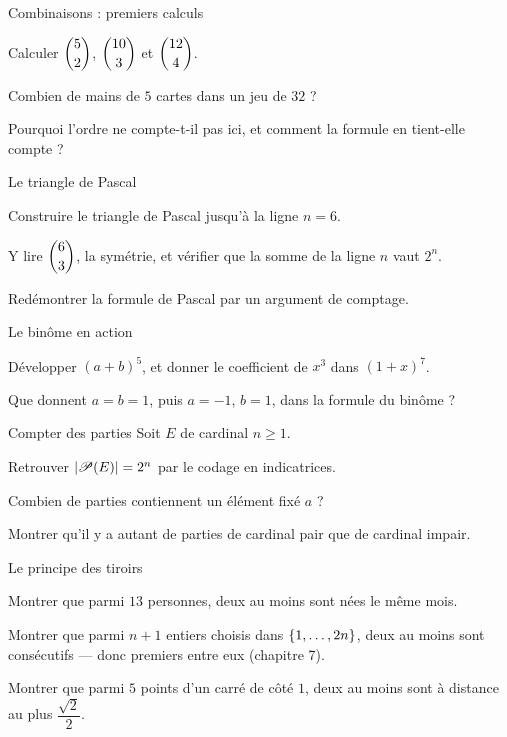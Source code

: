\begin{exercice}[1]{Combinaisons : premiers calculs}
\begin{questions}
  \item Calculer $\dbinom52$, $\dbinom{10}3$ et $\dbinom{12}4$.
  \item Combien de mains de $5$ cartes dans un jeu de $32$ ?
  \item Pourquoi l'ordre ne compte-t-il pas ici, et comment la formule en
    tient-elle compte ?
\end{questions}
\end{exercice}

\begin{exercice}[1]{Le triangle de Pascal}
\begin{questions}
  \item Construire le triangle de Pascal jusqu'à la ligne $n=6$.
  \item Y lire $\dbinom63$, la symétrie, et vérifier que la somme de la
    ligne $n$ vaut $2^{n}$.
  \item Redémontrer la formule de Pascal par un argument de comptage.
\end{questions}
\end{exercice}

\begin{exercice}[1]{Le binôme en action}
\begin{questions}
  \item Développer $(a+b)^{5}$, et donner le coefficient de $x^{3}$ dans
    $(1+x)^{7}$.
  \item Que donnent $a=b=1$, puis $a=-1$, $b=1$, dans la formule du
    binôme ?
\end{questions}
\end{exercice}

\begin{exercice}[1]{Compter des parties}
Soit $E$ de cardinal $n\geqslant1$.
\begin{questions}
  \item Retrouver $|\mathscr{P}(E)|=2^{n}$ par le codage en indicatrices.
  \item Combien de parties contiennent un élément fixé $a$ ?
  \item Montrer qu'il y a autant de parties de cardinal pair que de
    cardinal impair.
\end{questions}
\end{exercice}


\begin{exercice}[2]{Le principe des tiroirs}
\begin{questions}
  \item Montrer que parmi $13$ personnes, deux au moins sont nées le même
    mois.
  \item Montrer que parmi $n+1$ entiers choisis dans $\left\{1,\dots,2n\right\}$,
    deux au moins sont consécutifs — donc premiers entre eux
    (chapitre 7).
  \item Montrer que parmi $5$ points d'un carré de côté $1$, deux au
    moins sont à distance au plus $\dfrac{\sqrt2}{2}$.
\end{questions}
\end{exercice}

